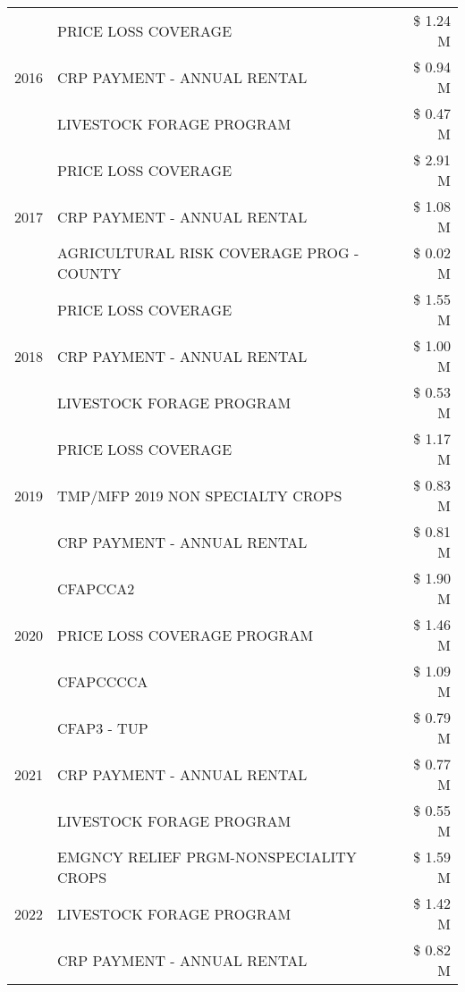 \begin{tabular}{llr}
\cline{1-3}
\multirow[t]{3}{*}{2016} & PRICE LOSS COVERAGE & \$ 1.24 M \\
 & CRP PAYMENT - ANNUAL RENTAL & \$ 0.94 M \\
 & LIVESTOCK FORAGE PROGRAM & \$ 0.47 M \\
\cline{1-3}
\multirow[t]{3}{*}{2017} & PRICE LOSS COVERAGE & \$ 2.91 M \\
 & CRP PAYMENT - ANNUAL RENTAL & \$ 1.08 M \\
 & AGRICULTURAL RISK COVERAGE PROG - COUNTY & \$ 0.02 M \\
\cline{1-3}
\multirow[t]{3}{*}{2018} & PRICE LOSS COVERAGE & \$ 1.55 M \\
 & CRP PAYMENT - ANNUAL RENTAL & \$ 1.00 M \\
 & LIVESTOCK FORAGE PROGRAM & \$ 0.53 M \\
\cline{1-3}
\multirow[t]{3}{*}{2019} & PRICE LOSS COVERAGE & \$ 1.17 M \\
 & TMP/MFP 2019 NON SPECIALTY CROPS & \$ 0.83 M \\
 & CRP PAYMENT - ANNUAL RENTAL & \$ 0.81 M \\
\cline{1-3}
\multirow[t]{3}{*}{2020} & CFAPCCA2 & \$ 1.90 M \\
 & PRICE LOSS COVERAGE PROGRAM & \$ 1.46 M \\
 & CFAPCCCCA & \$ 1.09 M \\
\cline{1-3}
\multirow[t]{3}{*}{2021} & CFAP3 - TUP & \$ 0.79 M \\
 & CRP PAYMENT - ANNUAL RENTAL & \$ 0.77 M \\
 & LIVESTOCK FORAGE PROGRAM & \$ 0.55 M \\
\cline{1-3}
\multirow[t]{3}{*}{2022} & EMGNCY RELIEF PRGM-NONSPECIALITY CROPS & \$ 1.59 M \\
 & LIVESTOCK FORAGE PROGRAM & \$ 1.42 M \\
 & CRP PAYMENT - ANNUAL RENTAL & \$ 0.82 M \\
\cline{1-3}
\bottomrule
\end{tabular}
